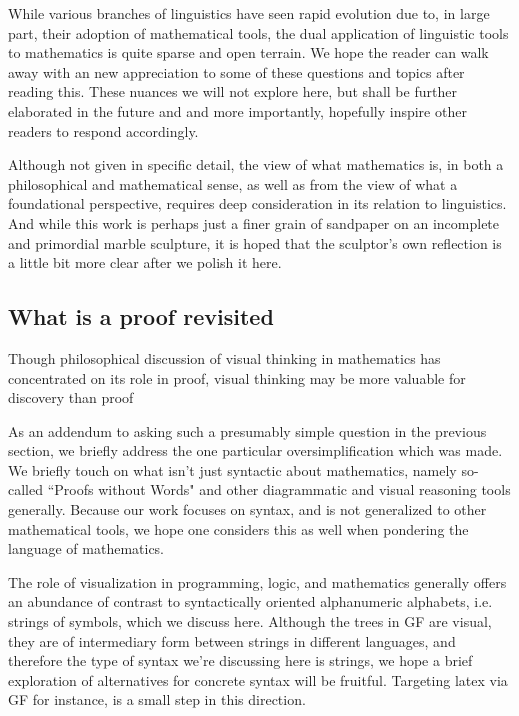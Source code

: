 While various branches of linguistics have seen rapid evolution due to, in large
part, their adoption of mathematical tools, the dual application of linguistic
tools to mathematics is quite sparse and open terrain. We hope the reader can
walk away with an new appreciation to some of these questions and topics after
reading this. These nuances we will not explore here, but shall be further
elaborated in the future and and more importantly, hopefully inspire other
readers to respond accordingly.

Although not given in specific detail, the view of what mathematics is, in both
a philosophical and mathematical sense, as well as from the view of what a
foundational perspective, requires deep consideration in its relation to
linguistics. And while this work is perhaps just a finer grain of sandpaper on
an incomplete and primordial marble sculpture, it is hoped that the sculptor's
own reflection is a little bit more clear after we polish it here.

\subsection{What is a proof revisited}

\begin{displayquote}
Though philosophical discussion of visual thinking in mathematics has
concentrated on its role in proof, visual thinking may be more valuable for
discovery than proof \cite{sep-epistemology-visual-thinking}
\end{displayquote}

As an addendum to asking such a presumably simple question in the previous
section, we briefly address the one particular oversimplification which was
made. We briefly touch on what isn't just syntactic about mathematics, namely
so-called ``Proofs without Words" \cite{proofWW} and other diagrammatic and visual
reasoning tools generally. Because our work focuses on syntax, and is not
generalized to other mathematical tools, we hope one considers this as well when
pondering the language of mathematics.

The role of visualization in programming, logic, and mathematics generally offers
an abundance of contrast to syntactically oriented alphanumeric alphabets, i.e.
strings of symbols, which we discuss here. Although the trees in GF are visual,
they are of intermediary form between strings in different languages, and
therefore the type of syntax we're discussing here is strings, we hope a brief
exploration of alternatives for concrete syntax will be fruitful. Targeting
latex via GF for instance, is a small step in this direction.

